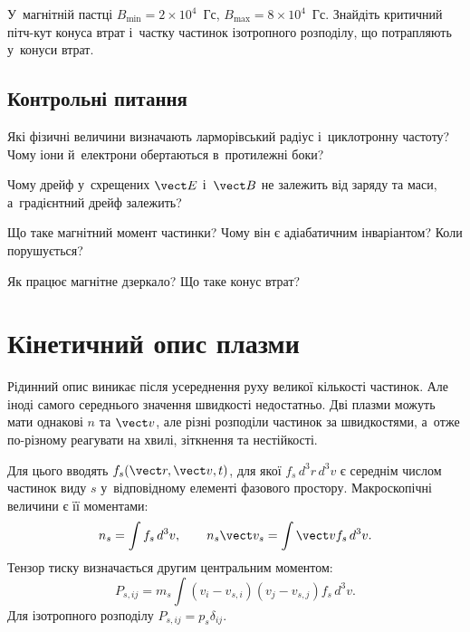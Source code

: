 \begin{problem}\label{prb:PlasmaMirror}
	У~магнітній пастці $B_{\min}=2\times10^4$~Гс, $B_{\max}=8\times10^4$~Гс. Знайдіть
	критичний пітч-кут конуса втрат і~частку частинок ізотропного розподілу, що
	потрапляють у~конуси втрат.
\end{problem}

\section*{Контрольні питання}

\begin{Questions}
\begin{quizlist}
\item Які фізичні величини визначають ларморівський радіус і~циклотронну частоту?
		  Чому іони й~електрони обертаються в~протилежні боки?

\item Чому дрейф у~схрещених $\vect E$ і~$\vect B$ не залежить від заряду та маси,
		  а~градієнтний дрейф залежить?

\item Що таке магнітний момент частинки? Чому він є адіабатичним інваріантом? Коли
		  порушується?

\item Як працює магнітне дзеркало? Що таке конус втрат?

\end{quizlist}
\end{Questions}

\chapter{Кінетичний опис плазми}\label{sec:plasma-kinetic}\hypertarget{plasma-kinetic}{}

Рідинний опис виникає після усереднення руху великої кількості частинок. Але іноді самого
середнього значення швидкості недостатньо. Дві плазми можуть мати однакові $n$ та $\vect
v$, але різні розподіли частинок за швидкостями, а~отже по-різному реагувати на хвилі,
зіткнення та нестійкості.

Для цього вводять  $f_s(\vect r,\vect v,t)$, для якої
$f_s\,d^3r\,d^3v$ є середнім числом частинок виду $s$ у~відповідному елементі фазового
простору. Макроскопічні величини є її моментами:
\begin{equation}\label{eq:kinetic-moments}
 n_s=\int f_s\,d^3v,
 \qquad
 n_s\vect v_s=\int\vect v f_s\,d^3v.
\end{equation}
Тензор тиску визначається другим центральним моментом:
\begin{equation*}
 P_{s,ij}=m_s\int(v_i-v_{s,i})(v_j-v_{s,j})f_s\,d^3v.
\end{equation*}
Для ізотропного розподілу $P_{s,ij}=p_s\delta_{ij}$.

